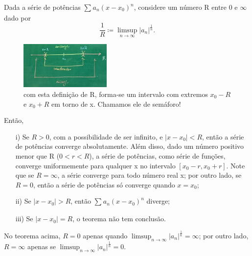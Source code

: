 \documentclass[../analysisII_notes.tex]{subfiles}
\begin{document}
\hypertarget{convergence_radius}{\begin{theorem*}
		Dada a série de potências \(\sum\limits_{}^{}a_{n}(x-x_{0})^{n}\), considere um número R entre 0 e \(\infty\) dado por
		\[
			\frac{1}{R} \coloneqq \limsup_{n\to \infty}|a_{n}|^{\frac{1}{n}}.
		\]
		\begin{figure}[H]
			\begin{center}
				\includegraphics[height=0.4\textheight, width=0.4\textwidth, keepaspectratio]{./Images/convergence_radius_20.png}
			\end{center}
			\caption{com esta definição de R, forma-se um intervalo com extremos \(x_{0}-R\) e \(x_{0} + R\) em torno de x. Chamamos ele de semáforo!}
			\label{convradi20}
		\end{figure}
		Então,
		\begin{itemize}
			\item[i)] Se \(R > 0\), com a possibilidade de ser infinito, e \(|x-x_{0}| < R\), então a série de potências converge absolutamente. Além disso, dado um número positivo menor que R (\(0 < r < R\)), a série de potências, como série de funções, converge uniformemente para qualquer x no intervalo \([x_{0}-r, x_{0}+r]\). Note que se \(R = \infty\), a série converge para todo número real x; por outro lado, se \(R = 0\), então a série de potências só converge quando \(x=x_{0}\);
			\item[ii)] Se \(|x-x_{0}| > R\), então \(\sum\limits_{}^{}a_{n}(x-x_{0})^{n}\) diverge;
			\item[iii)] Se \(|x-x_{0}|=R\), o teorema não tem conclusão.
		\end{itemize}
	\end{theorem*}}
\begin{tcolorbox}[
		skin=enhanced,
		title=Observação,
		fonttitle=\bfseries,
		colframe=black,
		colbacktitle=cyan!75!white,
		colback=cyan!15,
		colbacklower=black,
		coltitle=black,
		drop fuzzy shadow,
	]
	No teorema acima, \(R = 0\) apenas quando \(\limsup_{n\to \infty}|a_{n}|^{\frac{1}{n}} = \infty\); por outro lado, \(R = \infty\) apenas se \(\limsup_{n\to \infty}|a_{n}|^{\frac{1}{n}} = 0.\)
\end{tcolorbox}
\end{document}
